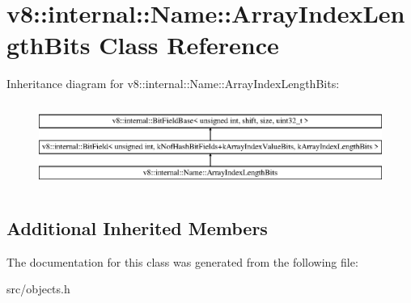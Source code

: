 \hypertarget{classv8_1_1internal_1_1_name_1_1_array_index_length_bits}{}\section{v8\+:\+:internal\+:\+:Name\+:\+:Array\+Index\+Length\+Bits Class Reference}
\label{classv8_1_1internal_1_1_name_1_1_array_index_length_bits}
Inheritance diagram for v8\+:\+:internal\+:\+:Name\+:\+:Array\+Index\+Length\+Bits\+:\begin{figure}[H]
\begin{center}
\leavevmode
\includegraphics[height=2.800000cm]{classv8_1_1internal_1_1_name_1_1_array_index_length_bits}
\end{center}
\end{figure}
\subsection*{Additional Inherited Members}


The documentation for this class was generated from the following file\+:\begin{DoxyCompactItemize}
\item 
src/objects.\+h\end{DoxyCompactItemize}

